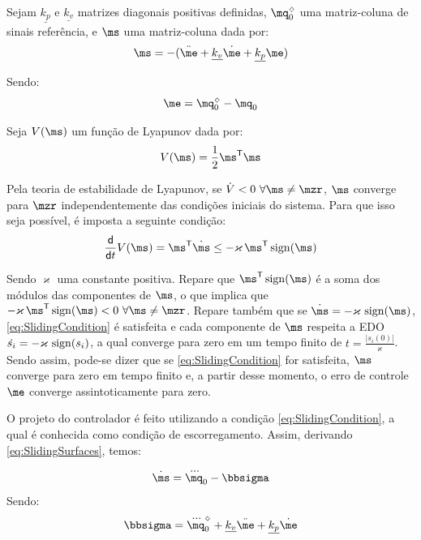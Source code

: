 \documentclass[a4paper,11pt,brazil,fleqn]{article}
\begin{document}
Sejam $\underline{k_p}$ e $\underline{k_v}$ matrizes diagonais positivas definidas, $\mq_0^\sdia$ uma matriz-coluna de sinais refer\^encia, e $\ms$ uma matriz-coluna dada por:
\begin{equation} \label{eq:SlidingSurfaces}
\ms = -(\ddot{\me} + \underline{k_v}\dot{\me} + \underline{k_p}\me)
\end{equation} 

Sendo:
\begin{equation}
\me = \mq_0^\sdia - \mq_0
\end{equation}

Seja $V(\ms)$ um fun\c{c}\~ao de Lyapunov dada por:
\begin{equation}
V(\ms) = \frac{1}{2} \ms^\msT \ms
\end{equation}

Pela teoria de estabilidade de Lyapunov, se $\dot{V} < 0 \,\, \forall \ms \neq \mzr$, $\ms$ converge para $\mzr$ independentemente das condi\c{c}\~oes iniciais do sistema. Para que isso seja poss\'ivel, \'e imposta a seguinte condi\c{c}\~ao:
\begin{equation} \label{eq:SlidingCondition}
\frac{\dd}{\dd t} V(\ms) = \ms^\msT \dot{\ms} \leq - \varkappa \, \ms^\msT \sign(\ms) 
\end{equation}

Sendo $\varkappa$ uma constante positiva. Repare que $\ms^\msT \sign(\ms)$ \'e a soma dos m\'odulos das componentes de $\ms$, o que implica que $- \varkappa \, \ms^\msT \sign(\ms) < 0 \,\, \forall \ms \neq \mzr$. Repare tamb\'em que se $\dot{\ms} = - \varkappa \,\sign(\ms)$,  \eqref{eq:SlidingCondition} \'e satisfeita e cada componente de $\ms$ respeita a EDO $\dot{s_i} = - \varkappa \,\operatorname*{sign}(s_i)$, a qual converge para zero em um tempo finito de $t = \frac{|s_i(0)|}{\varkappa}$. Sendo assim, pode-se dizer que se \eqref{eq:SlidingCondition} for satisfeita, $\ms$ converge para zero em tempo finito e, a partir desse momento, o erro de controle $\me$ converge assintoticamente para zero.

O projeto do controlador \'e feito utilizando a condi\c{c}\~ao \eqref{eq:SlidingCondition}, a qual \'e conhecida como condi\c{c}\~ao de escorregamento. Assim, derivando \eqref{eq:SlidingSurfaces}, temos:

\begin{equation} \label{eq:DSlidingSurfaces}
\dot{\ms} = \dddot{\mq}_0 - \msigma
\end{equation}
Sendo:
\begin{equation}
\msigma = \dddot{\mq}_0^\sdia + \underline{k_v}\ddot{\me} + \underline{k_p}\dot{\me}
\end{equation}
\end{document}
